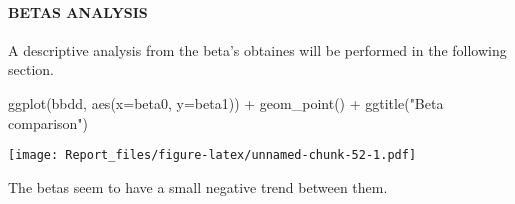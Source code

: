 \documentclass[
]{article}
\newenvironment{Shaded}{\begin{snugshade}}{\end{snugshade}}
\newcommand{\AttributeTok}[1]{\textcolor[rgb]{0.77,0.63,0.00}{#1}}
\newcommand{\DecValTok}[1]{\textcolor[rgb]{0.00,0.00,0.81}{#1}}
\newcommand{\FunctionTok}[1]{\textcolor[rgb]{0.00,0.00,0.00}{#1}}
\newcommand{\NormalTok}[1]{#1}
\newcommand{\OtherTok}[1]{\textcolor[rgb]{0.56,0.35,0.01}{#1}}
\newcommand{\SpecialCharTok}[1]{\textcolor[rgb]{0.00,0.00,0.00}{#1}}
\newcommand{\StringTok}[1]{\textcolor[rgb]{0.31,0.60,0.02}{#1}}
\begin{document}
\begin{Shaded}
\end{Shaded}

\hypertarget{betas-analysis}{%
\paragraph{BETAS ANALYSIS}\label{betas-analysis}}

A descriptive analysis from the beta's obtaines will be performed in the
following section.

\begin{Shaded}
\begin{Highlighting}[]
\FunctionTok{ggplot}\NormalTok{(bbdd, }\FunctionTok{aes}\NormalTok{(}\AttributeTok{x=}\NormalTok{beta0, }\AttributeTok{y=}\NormalTok{beta1)) }\SpecialCharTok{+} \FunctionTok{geom\_point}\NormalTok{() }\SpecialCharTok{+} \FunctionTok{ggtitle}\NormalTok{(}\StringTok{"Beta comparison"}\NormalTok{)}
\end{Highlighting}
\end{Shaded}

\texttt{[image: Report\_files/figure-latex/unnamed-chunk-52-1.pdf]}

The betas seem to have a small negative trend between them.
\end{document}
